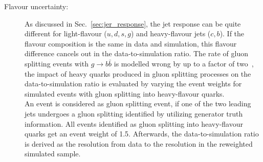 \begin{description}
\item[Flavour uncertainty:] As discussed in Sec.~\ref{sec:jer_response}, the jet response can be quite different for light-flavour ($u,d,s,g$) and heavy-flavour jets ($c,b$). If the flavour composition is the same in data and simulation, this flavour difference cancels out in the data-to-simulation ratio. The rate of gluon splitting events with $g \rightarrow b\bar{b}$ is modelled wrong by up to a factor of two~\cite{Khachatryan:2011wq}, the impact of heavy quarks produced in gluon splitting processes on the data-to-simulation ratio is evaluated by varying the event weights for simulated events with gluon splitting into heavy-flavour quarks.\\
An event is considered as gluon splitting event, if one of the two leading jets undergoes a gluon splitting identified by utilizing generator truth information. All events identified as gluon splitting into heavy-flavour quarks get an event weight of 1.5. Afterwards, the data-to-simulation ratio is derived as the resolution from data to the resolution in the reweighted simulated sample. 


\end{description}
